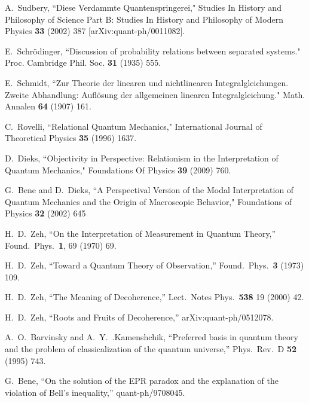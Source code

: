 \documentclass[12pt]{article}
\begin{document}
\begin{thebibliography}{99}

{\small


A.~Sudbery, ``Diese Verdammte Quantenspringerei," Studies In History and Philosophy of Science Part B: Studies In History and Philosophy of Modern Physics
{\bf 33} (2002) 387 [arXiv:quant-ph/0011082].



E.~Schr\"odinger, ``Discussion of probability relations between separated systems." Proc. Cambridge Phil. Soc. {\bf31} (1935) 555.

E.~Schmidt, ``Zur Theorie der linearen und nichtlinearen Integralgleichungen. Zweite Abhandlung: Aufl\"osung der allgemeinen linearen Integralgleichung." Math. Annalen {\bf64} (1907) 161.
  
   
C.~Rovelli, ``Relational Quantum Mechanics," International Journal of Theoretical Physics {\bf35} (1996) 1637. 
 

D.~Dieks, ``Objectivity in Perspective: Relationism in the Interpretation of Quantum Mechanics," Foundations Of Physics {\bf39} (2009) 760.    
 
 
G.~Bene and D.~Dieks, ``A Perspectival Version of the Modal Interpretation of Quantum Mechanics and the Origin of Macroscopic Behavior," Foundations of Physics {\bf32} (2002) 645

 
 H.~D.~Zeh, ``On the Interpretation of Measurement in
Quantum Theory,'' Found.\ Phys.\ {\bf 1}, 69 (1970) 69.

 H.~D.~Zeh, ``Toward a Quantum Theory of Observation,''
Found.\ Phys.\ {\bf 3} (1973) 109.


 H.~D.~Zeh, ``The Meaning of Decoherence,'' Lect.\ Notes
Phys.\ {\bf 538} 19 (2000) 42.


 H.~D.~Zeh, ``Roots and Fruits of Decoherence,''
arXiv:quant-ph/0512078.

  A.~O.~Barvinsky and A.~Y.~.Kamenshchik,
  ``Preferred basis in quantum theory and the problem of classicalization of the quantum universe,''
  Phys.\ Rev.\ D {\bf 52} (1995) 743.

  G.~Bene,
  ``On the solution of the EPR paradox and the explanation of the violation of Bell's inequality,''
  quant-ph/9708045.
  
}
\end{thebibliography}
\end{document}
